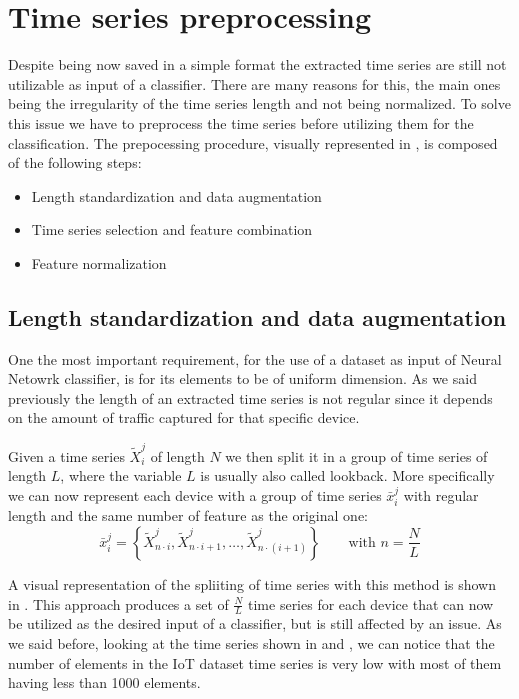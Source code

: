 \section{Time series preprocessing}

Despite being now saved in a simple format the extracted time series are still not utilizable as input of a classifier. There are many reasons for this, the main ones being the irregularity of the time series length and not being normalized. To solve this issue we have to preprocess the time series before utilizing them for the classification. 
The prepocessing procedure, visually represented in , is composed of the following steps:
\begin{itemize}[noitemsep]
    \item {Length standardization} and data augmentation
    \item Time series selection and feature combination
    \item Feature normalization
\end{itemize}

\subsection{Length standardization and data augmentation} \label{splitting}

One the most important requirement, for the use of a dataset as input of Neural Netowrk classifier, is for its elements to be of uniform dimension. As we said previously the length of an extracted time series is not regular since it depends on the amount of traffic captured for that specific device.

Given a time series ${\tilde{X}_i^j}$ of length $N$ we then split it in a group of time series of length $L$, where the variable $L$ is usually also called lookback. More specifically we can now represent each device with a group of time series $\bar{x}_i^j$ with regular length and the same number of feature as the original one:
\begin{equation}
    \bar{x}_i^j = \left\{\tilde{X}_{n\cdot i}^j, \tilde{X}_{n\cdot i +1 }^j, \dots, \tilde{X}_{n\cdot(i+1)}^j  \right\}
    \qquad\text{with }n=\frac{N}{L}
\end{equation}

A visual representation of the spliiting of time series with this method is shown in . This approach produces a set of $\frac{N}{L}$ time series for each device that can now be utilized as the desired input of a classifier, but is still affected by an issue. As we said before, looking at the time series shown in  and , we can notice that the number of elements in the IoT dataset time series is very low with most of them having less than 1000 elements. 


